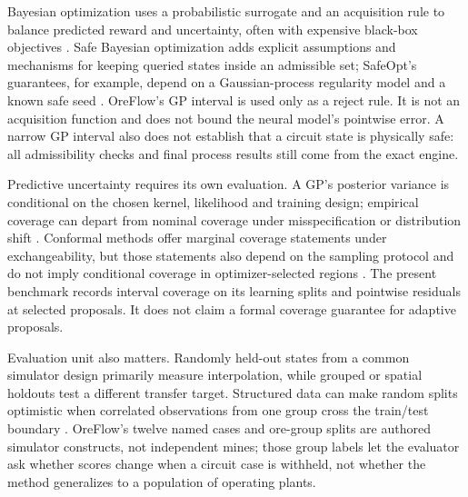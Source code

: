 \documentclass[10pt]{article}
\begin{document}
Bayesian optimization uses a probabilistic surrogate and an acquisition rule to balance predicted reward and uncertainty, often with expensive black-box objectives \cite{Jones1998,Srinivas2010,Shahriari2016,Eriksson2019}. Safe Bayesian optimization adds explicit assumptions and mechanisms for keeping queried states inside an admissible set; SafeOpt's guarantees, for example, depend on a Gaussian-process regularity model and a known safe seed \cite{Sui2015}. OreFlow's GP interval is used only as a reject rule. It is not an acquisition function and does not bound the neural model's pointwise error. A narrow GP interval also does not establish that a circuit state is physically safe: all admissibility checks and final process results still come from the exact engine.

Predictive uncertainty requires its own evaluation. A GP's posterior variance is conditional on the chosen kernel, likelihood and training design; empirical coverage can depart from nominal coverage under misspecification or distribution shift \cite{RasmussenWilliams2006,Papadopoulos2024,KendallGal2017,Lakshminarayanan2017}. Conformal methods offer marginal coverage statements under exchangeability, but those statements also depend on the sampling protocol and do not imply conditional coverage in optimizer-selected regions \cite{AngelopoulosBates2023}. The present benchmark records interval coverage on its learning splits and pointwise residuals at selected proposals. It does not claim a formal coverage guarantee for adaptive proposals.

Evaluation unit also matters. Randomly held-out states from a common simulator design primarily measure interpolation, while grouped or spatial holdouts test a different transfer target. Structured data can make random splits optimistic when correlated observations from one group cross the train/test boundary \cite{Roberts2017,CawleyTalbot2010}. OreFlow's twelve named cases and ore-group splits are authored simulator constructs, not independent mines; those group labels let the evaluator ask whether scores change when a circuit case is withheld, not whether the method generalizes to a population of operating plants.
\end{document}
